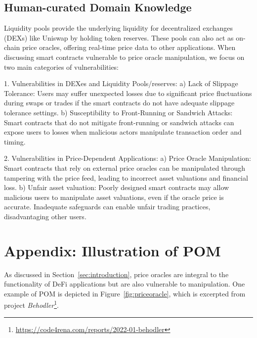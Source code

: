 \subsection{Human-curated Domain Knowledge} \label{app:humanknowledge}
\begin{tcolorbox}[colback=gray!20!white, colframe=gray!75!black, boxsep=5pt, arc=4pt, boxrule=1pt, left=0pt, right=0pt, title={Human-curated Domain Knowledge}, label=humanknowledge]
Liquidity pools provide the underlying liquidity for decentralized exchanges (DEXs) like Uniswap by holding token reserves. These pools can also act as on-chain price oracles, offering real-time price data to other applications. When discussing smart contracts vulnerable to price oracle manipulation, we focus on two main categories of vulnerabilities:

1. Vulnerabilities in DEXes and Liquidity Pools/reserves: a) Lack of Slippage Tolerance: Users may suffer unexpected losses due to significant price fluctuations during swaps or trades if the smart contracts do not have adequate slippage tolerance settings. b) Susceptibility to Front-Running or Sandwich Attacks: Smart contracts that do not mitigate front-running or sandwich attacks can expose users to losses when malicious actors manipulate transaction order and timing.

2. Vulnerabilities in Price-Dependent Applications: a) Price Oracle Manipulation: Smart contracts that rely on external price oracles can be manipulated through tampering with the price feed, leading to incorrect asset valuations and financial loss. b) Unfair asset valuation: Poorly designed smart contracts may allow malicious users to manipulate asset valuations, even if the oracle price is accurate. Inadequate safeguards can enable unfair trading practices, disadvantaging other users.
\end{tcolorbox}

\section{Appendix: Illustration of POM} \label{app:oraclemanip}
As discussed in Section~\ref{sec:introduction}, price oracles are integral to the functionality of DeFi applications but are also vulnerable to manipulation. One example of POM is depicted in Figure~\ref{fig:priceoracle}, which is excerpted from project \textit{Behodler}\footnote{\url{https://code4rena.com/reports/2022-01-behodler}}.


